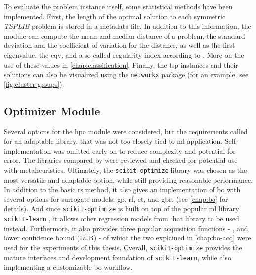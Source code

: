 To evaluate the problem instance itself, some statistical methods have been implemented. First, the length of the optimal solution to each symmetric \textit{TSPLIB} problem is stored in a metadata file. In addition to this information, the module can compute the mean and median distance of a problem, the standard deviation and the coefficient of variation for the distance, as well as the first eigenvalue, the \gls{cqv}, and a so-called regularity index according to \cite{clark1954distance, cricsan2021randomness, dry2012clustering}. More on the use of these values in \cref{chap:classification}.
Finally, the \gls{tsp} instances and their solutions can also be visualized using the \texttt{networkx} package \cite{hagberg2008exploring} (for an example, see \cref{fig:cluster-groups}).


\subsection{Optimizer Module}
\label{chap:optimizer}

Several options for the \gls{hpo} module were considered, but the requirements called for an adaptable library, that was not too closely tied to \gls{ml} application. Self-implementation was omitted early on to reduce complexity and potential for error. The libraries compared by \citet{yang2020hyperparameter} were reviewed and checked for potential use with metaheuristics. Ultimately, the \texttt{scikit-optimize} library \cite{head2020scikit} was chosen as the most versatile and adaptable option, while still providing reasonable performance. In addition to the basic \gls{rs} method, it also gives an implementation of \glsdesc{bo} with several options for surrogate models: \gls{gp}, \gls{rf}, \gls{et}, and \gls{gbrt} (see \cref{chap:bo} for details). And since \texttt{scikit-optimize} is built on top of the popular \gls{ml} library \texttt{scikit-learn} \cite{scikit-learn2011}, it allows other  regression models from that library to be used instead. Furthermore, it also provides three popular acquisition functions - ,  and lower confidence bound (LCB) - of which the two explained in \cref{chap:bo-acq} were used for the experiments of this thesis.
Overall, \texttt{scikit-optimize} provides the mature interfaces and development foundation of \texttt{scikit-learn}, while also implementing a customizable \glsdesc{bo} workflow.

